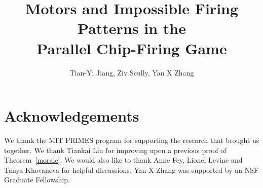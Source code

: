 \documentclass[11pt]{amsart}
\newlength{\figWidthA}
\newlength{\figWidthB}
\numberwithin{equation}{section}
\begin{document}
\setlength{}
\setlength{}

\title[Motors and Impossible Firing Patterns in the PCFG]{Motors and Impossible
  Firing Patterns in the\\Parallel Chip-Firing Game}
\author{Tian-Yi Jiang, Ziv Scully, Yan X Zhang}
\address{Massachusetts Institute of Technology}
\begin{abstract}

\end{abstract}
\maketitle

















\section*{Acknowledgements}
We thank the MIT PRIMES program for supporting the research that brought us
together. We thank Tiankai Liu for improving upon a previous proof of
Theorem~\ref{morale}. We would also like to thank Anne Fey, Lionel Levine and
Tanya Khovanova for helpful discussions. Yan X Zhang was supported by an NSF
Graduate Fellowship.



\end{document}
